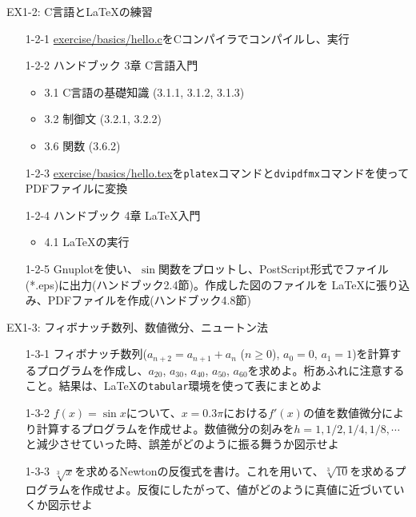 \documentclass[dvipdfmx]{beamer}
\begin{document}
\begin{frame}[t,fragile]{EX1-2: C言語と\LaTeX の練習}
  \begin{itemize}
  \item[1-2-1] \href{https://github.com/todo-group/computer-experiments/blob/master/exercise/basics/hello.c}{exercise/basics/hello.c}をCコンパイラでコンパイルし、実行
  \item[1-2-2] ハンドブック 3章 C言語入門
    \begin{itemize}
    \item 3.1 C言語の基礎知識 (3.1.1, 3.1.2, 3.1.3)
    \item 3.2 制御文 (3.2.1, 3.2.2)
    \item 3.6 関数 (3.6.2)
    \end{itemize}
  \item[1-2-3] \href{https://github.com/todo-group/computer-experiments/blob/master/exercise/basics/hello.tex}{exercise/basics/hello.tex}を{\tt platex}コマンドと{\tt dvipdfmx}コマンドを使ってPDFファイルに変換
  \item[1-2-4] ハンドブック 4章 \LaTeX 入門
    \begin{itemize}
    \item 4.1 \LaTeX の実行
    \end{itemize}
  \item[1-2-5] Gnuplotを使い、$\sin$関数をプロットし、PostScript形式でファイル(*.eps)に出力(ハンドブック2.4節)。作成した図のファイルを \LaTeX に張り込み、PDFファイルを作成(ハンドブック4.8節)
  \end{itemize}
\end{frame}

\begin{frame}[t,fragile]{EX1-3: フィボナッチ数列、数値微分、ニュートン法}
  \begin{itemize}
    \setlength{\itemsep}{1em}
  \item[1-3-1] フィボナッチ数列($a_{n+2}=a_{n+1}+a_n$ ($n \ge 0$), $a_0=0$, $a_1=1$)を計算するプログラムを作成し、$a_{20}$, $a_{30}$, $a_{40}$, $a_{50}$, $a_{60}$を求めよ。桁あふれに注意すること。結果は、\LaTeX の{\tt tabular}環境を使って表にまとめよ
  \item[1-3-2] $f(x)=\sin x$について、$x=0.3\pi$における$f'(x)$の値を数値微分により計算するプログラムを作成せよ。数値微分の刻みを$h=1,1/2,1/4,1/8,\cdots$と減少させていった時、誤差がどのように振る舞うか図示せよ
  \item[1-3-3] $\sqrt[3]{x}$を求めるNewtonの反復式を書け。これを用いて、$\sqrt[3]{10}$を求めるプログラムを作成せよ。反復にしたがって、値がどのように真値に近づいていくか図示せよ
  \end{itemize}    
\end{frame}
\end{document}
